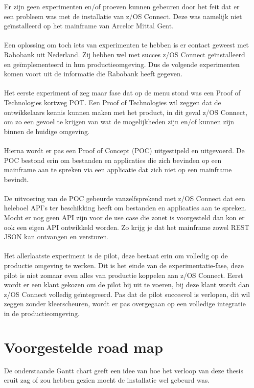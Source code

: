 \documentclass[a0,portrait]{hogent-poster}
\begin{document}
\begin{multicols}{2}
Er zijn geen experimenten en/of proeven kunnen gebeuren door het feit dat er een probleem was met de installatie van z/OS Connect. Deze was namelijk niet geïnstalleerd op het mainframe van Arcelor Mittal Gent.
\\ \\
Een oplossing om toch iets van experimenten te hebben is er contact geweest met Rabobank uit Nederland. Zij hebben wel met succes z/OS Connect geïnstalleerd en geïmplementeerd in hun productieomgeving. Dus de volgende experimenten komen voort uit de informatie die Rabobank heeft gegeven.
\\ \\
Het eerste experiment of zeg maar fase dat op de menu stond was een Proof of Technologies kortweg POT. Een Proof of Technologies wil zeggen dat de ontwikkelaars kennis kunnen maken met het product, in dit geval z/OS Connect, om zo een gevoel te krijgen van wat de mogelijkheden zijn en/of kunnen zijn binnen de huidige omgeving.
\\ \\
Hierna wordt er pas een Proof of Concept (POC) uitgestipeld en uitgevoerd. De POC bestond erin om bestanden en applicaties die zich bevinden op een mainframe aan te spreken via een applicatie dat zich niet op een mainframe bevindt.
\\ \\
De uitvoering van de POC gebeurde vanzelfsprekend met z/OS Connect dat een heleboel API's ter beschikking heeft om bestanden en applicaties aan te spreken. Mocht er nog geen API zijn voor de use case die zonet is voorgesteld dan kon er ook een eigen API ontwikkeld worden. Zo krijg je dat het mainframe zowel REST JSON kan ontvangen en versturen.
\\ \\
Het allerlaatste experiment is de pilot, deze bestaat erin om volledig op de productie omgeving te werken. Dit is het einde van de experimentatie-fase, deze pilot is niet zomaar even alles van productie koppelen aan z/OS Connect. Eerst wordt er een klant gekozen om de pilot bij uit te voeren, bij deze klant wordt dan z/OS Connect volledig geïntegreerd. Pas dat de pilot succesvol is verlopen, dit wil zeggen zonder kleerscheuren, wordt er pas overgegaan op een volledige integratie in de productieomgeving.

\section{Voorgestelde road map}
De onderstaande Gantt chart geeft een idee van hoe het verloop van deze thesis eruit zag of zou hebben gezien mocht de installatie wel gebeurd was.


\end{multicols}
\end{document}
